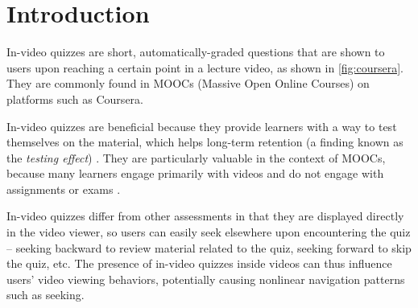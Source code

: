 \documentclass{sigchi}
\begin{document}


\section{Introduction}

In-video quizzes are short, automatically-graded questions that are shown to users upon reaching a certain point in a lecture video, as shown in \autoref{fig:coursera}. They are commonly found in MOOCs (Massive Open Online Courses) on platforms such as Coursera.

In-video quizzes are beneficial because they provide learners with a way to test themselves on the material, which helps long-term retention (a finding known as the \emph{testing effect}) \cite{testingeffect}. They are particularly valuable in the context of MOOCs, because many learners engage primarily with videos and do not engage with assignments or exams \cite{renedisengagement} \cite{ashton}.



In-video quizzes differ from other assessments in that they are displayed directly in the video viewer, so users can easily seek elsewhere upon encountering the quiz -- seeking backward to review material related to the quiz, seeking forward to skip the quiz, etc.
The presence of in-video quizzes inside videos can thus influence users' video viewing behaviors, potentially causing nonlinear navigation patterns such as seeking. %
\end{document}
